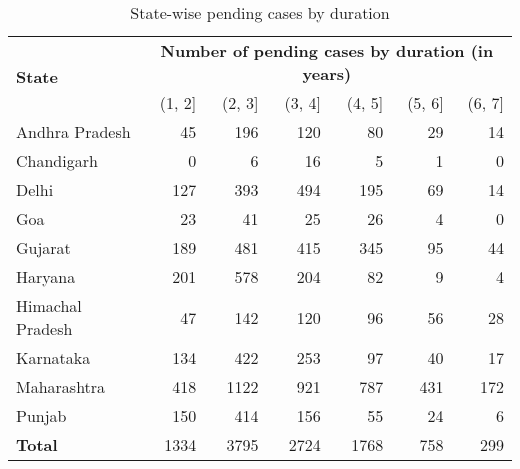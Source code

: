 \documentclass[12pt,a4paper]{article}
\begin{document}
		\begin{table}[!ht]
			\caption{State-wise pending cases by duration} \label{tab:state_pending}
			\centering
			\footnotesize
			\begin{tabular}{lrrrrrr}
				\toprule
				\multirow{2}{*}{\textbf{State}} & \multicolumn{6}{c}{\textbf{Number of pending cases by duration (in years)}} \\
				\cmidrule{2-7}
				& (1, 2] & (2, 3] & (3, 4] & (4, 5] & (5, 6] & (6, 7] \\
				\midrule
				Andhra Pradesh & 45 & 196 & 120 & 80 & 29 & 14 \\
				Chandigarh & 0 & 6 & 16 & 5 & 1 & 0 \\
				Delhi & 127 & 393 & 494 & 195 & 69 & 14 \\
				Goa & 23 & 41 & 25 & 26 & 4 & 0 \\
				Gujarat & 189 & 481 & 415 & 345 & 95 & 44 \\
				Haryana & 201 & 578 & 204 & 82 & 9 & 4 \\
				Himachal Pradesh & 47 & 142 & 120 & 96 & 56 & 28 \\
				Karnataka & 134 & 422 & 253 & 97 & 40 & 17 \\
				Maharashtra & 418 & 1122 & 921 & 787 & 431 & 172 \\
				Punjab & 150 & 414 & 156 & 55 & 24 & 6 \\
				\midrule
				\textbf{Total} & 1334 & 3795 & 2724 & 1768 & 758 & 299 \\
				\bottomrule
			\end{tabular}
		\end{table}
	
%	
	
\end{document}
